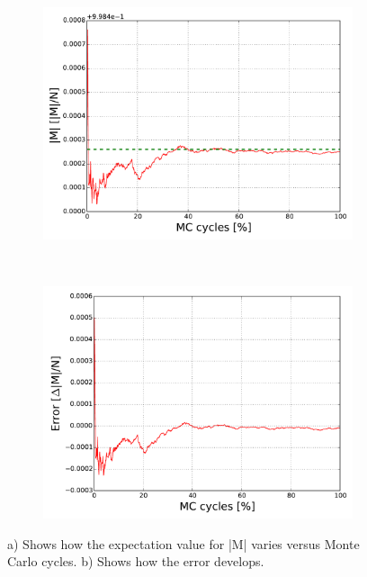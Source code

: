 \begin{figure}[H]
    \centering
    \begin{subfigure}{0.5\textwidth}
        \centering
        \includegraphics[width=\linewidth]{result/bilder/2x2/mabs22}
        \caption{}
    \end{subfigure}%
    ~ 
    \begin{subfigure}{0.5\textwidth}
        \centering
        \includegraphics[width=\linewidth]{result/bilder/2x2/mabserror22}
        \caption{}
    \end{subfigure}
    \caption{a) Shows how the expectation value for |M| varies versus Monte Carlo cycles. b) Shows how the error develops.}
    \label{fig:22-m}
\end{figure}


